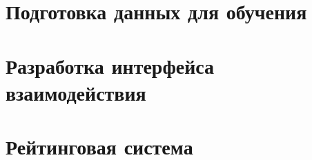 \label{work}


\section{Подготовка данных для обучения}



\section{Разработка интерфейса взаимодействия}



\section{Рейтинговая система}



















